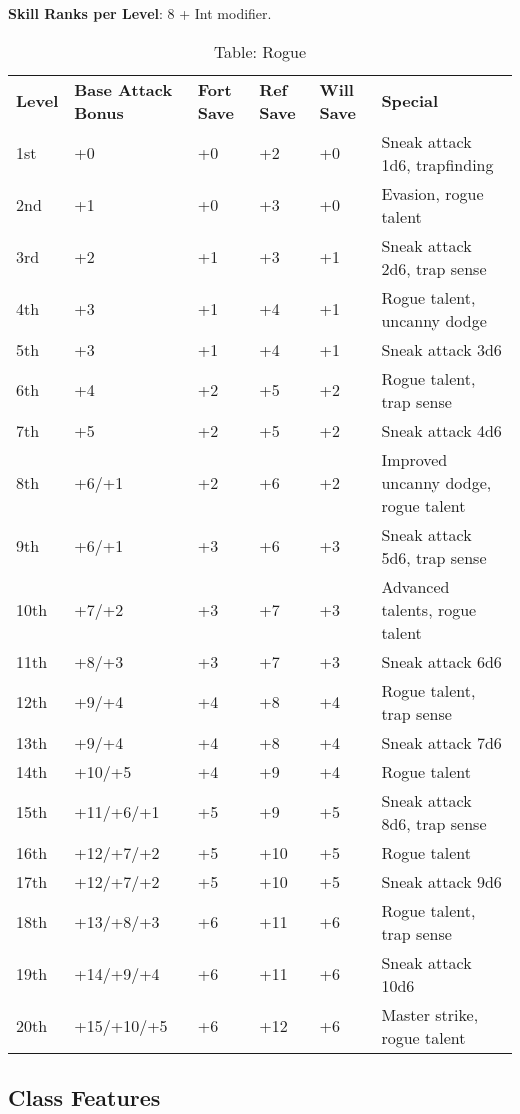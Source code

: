 \textbf{Skill Ranks per Level}: 8 + Int modifier.
\begin{table*}[]
\caption{Table: Rogue}
\sffamily
\begin{tabular}{llllll}
\textbf{Level} & \textbf{Base Attack Bonus} & \textbf{Fort Save} & \textbf{Ref Save} & \textbf{Will Save} & \textbf{Special}\\
1st & +0 & +0 & +2 & +0 & Sneak attack 1d6, trapfinding\\
2nd & +1 & +0 & +3 & +0 & Evasion, rogue talent\\
3rd & +2 & +1 & +3 & +1 & Sneak attack 2d6, trap sense\\
4th & +3 & +1 & +4 & +1 & Rogue talent, uncanny dodge\\
5th & +3 & +1 & +4 & +1 & Sneak attack 3d6\\
6th & +4 & +2 & +5 & +2 & Rogue talent, trap sense\\
7th & +5 & +2 & +5 & +2 & Sneak attack 4d6\\
8th & +6/+1 & +2 & +6 & +2 & Improved uncanny dodge, rogue talent\\
9th & +6/+1 & +3 & +6 & +3 & Sneak attack 5d6, trap sense\\
10th & +7/+2 & +3 & +7 & +3 & Advanced talents, rogue talent\\
11th & +8/+3 & +3 & +7 & +3 & Sneak attack 6d6\\
12th & +9/+4 & +4 & +8 & +4 & Rogue talent, trap sense\\
13th & +9/+4 & +4 & +8 & +4 & Sneak attack 7d6\\
14th & +10/+5 & +4 & +9 & +4 & Rogue talent\\
15th & +11/+6/+1 & +5 & +9 & +5 & Sneak attack 8d6, trap sense\\
16th & +12/+7/+2 & +5 & +10 & +5 & Rogue talent\\
17th & +12/+7/+2 & +5 & +10 & +5 & Sneak attack 9d6\\
18th & +13/+8/+3 & +6 & +11 & +6 & Rogue talent, trap sense\\
19th & +14/+9/+4 & +6 & +11 & +6 & Sneak attack 10d6\\
20th & +15/+10/+5 & +6 & +12 & +6 & Master strike, rogue talent\\
\end{tabular}
\end{table*}
				
\subsection{Class Features}

